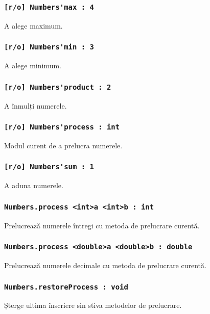 \subsubsection{\lstinline|[r/o] Numbers'max : 4|}

A alege maximum.

\subsubsection{\lstinline|[r/o] Numbers'min : 3|}

A alege minimum.

\subsubsection{\lstinline|[r/o] Numbers'product : 2|}

A înmulți numerele.

\subsubsection{\lstinline|[r/o] Numbers'process : int|}

Modul curent de a prelucra numerele.

\subsubsection{\lstinline|[r/o] Numbers'sum : 1|}

A aduna numerele.

\subsubsection{\lstinline|Numbers.process <int>a <int>b : int|}

Prelucrează numerele întregi cu metoda de prelucrare curentă.

\subsubsection{\lstinline|Numbers.process <double>a <double>b : double|}

Prelucrează numerele decimale cu metoda de prelucrare curentă.

\subsubsection{\lstinline|Numbers.restoreProcess : void|}

Șterge ultima înscriere sin stiva metodelor de prelucrare.

